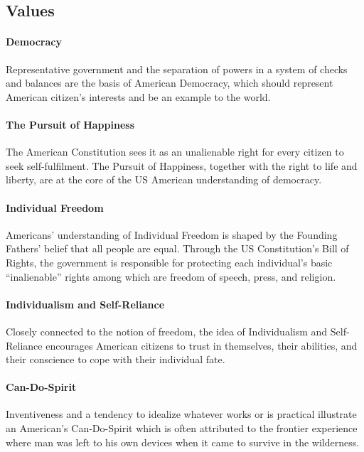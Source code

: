 \documentclass[10pt]{article}
\begin{document}
\subsection{Values}
	\label{sec:usa/values}
\paragraph{Democracy}\label{par:usa/values/dem}
Representative government and the separation of powers in a system of checks
and balances are the basis of American Democracy, which should represent American
citizen's interests and be an example to the world.

\paragraph{The Pursuit of Happiness}\label{par:usa/values/poh}
The American Constitution sees it as an unalienable right for every citizen to seek
self-fulfilment. The Pursuit of Happiness, together with the right to life and liberty, are at the core of the
US American understanding of democracy.

\paragraph{Individual Freedom}\label{par:usa/values/free}
Americans' understanding of Individual Freedom is shaped by the Founding Fathers' belief that all
people are equal. Through the US Constitution's Bill of Rights, the government is
responsible for protecting each individual's basic \enquote{inalienable} rights among
which are freedom of speech, press, and religion.

\paragraph{Individualism and Self-Reliance}\label{par:usa/values/indiv}
Closely connected to the notion of freedom, the idea of Individualism and Self-Reliance encourages American
citizens to trust in themselves, their abilities, and their conscience to cope with
their individual fate.

\paragraph{Can-Do-Spirit}\label{par:usa/values/cds}
Inventiveness and a tendency to idealize whatever works or is practical illustrate
an American's Can-Do-Spirit which is often attributed to the frontier experience where man
was left to his own devices when it came to survive in the wilderness.
\end{document}

